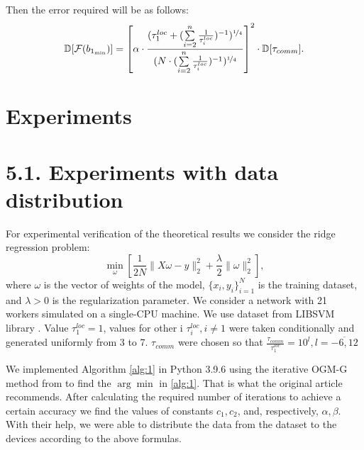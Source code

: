 \documentclass{article}
\theoremstyle{definition}
\theoremstyle{plain}
\begin{document}
Then the error required will be as follows:
\begin{equation}
    \label{eq:20}
    \mathbb D [\mathcal{F}(b_{1_{\min}})] = \left[\alpha\cdot\frac{(\tau_1^{loc} + (\sum\limits_{i = 2}^n \frac{1}{\tau_i^{loc}})^{-1})^{\nicefrac{1}{4}}}{(N\cdot (\sum\limits_{i = 2}^n \frac{1}{\tau_i^{loc}})^{-1})^{\nicefrac{1}{4}}}\right]^2\cdot \mathbb D [\tau_{comm}].
\end{equation}


\section{Experiments}

\section*{5.1. Experiments with data distribution}
For experimental verification of the theoretical results we consider the ridge regression problem: 
\begin{equation}
    \label{ridge}
    \underset{\omega}{\min}[ \frac{1}{2N} \|X\omega - y\|_2^2 + \frac{\lambda}{2}\|\omega\|_2^2],
\end{equation}
where $\omega$ is the vector of weights of the model, $\{x_i, y_i\}_{i = 1}^N$ is the training dataset, and $\lambda > 0$ is the regularization parameter. We consider a network  with 21 workers simulated on a single-CPU machine. We use dataset from LIBSVM library \cite{chang2011libsvm}. Value $\tau_1^{loc} = 1$, values for other i $\tau_i^{loc}, i \neq 1$ were taken conditionally and generated uniformly from 3 to 7. $\tau_{comm}$ were chosen so that $\frac{\tau _{comm}}{\tau _1^{loc}} = 10^l, l = \overline{-6, 12}$

 We implemented Algorithm \ref{alg:1} in Python 3.9.6 using the iterative OGM-G method from \cite{kim2021optimizing} to find the $\arg\min$ in \ref{alg:1}. That is what the original article \cite{kovalev2022optimal} recommends. After calculating the required number of iterations to achieve a certain accuracy we find the values of constants $c_1, c_2$, and, respectively, $\alpha, \beta$. With their help, we were able to distribute the data from the dataset to the devices according to the above formulas. 
\end{document}
